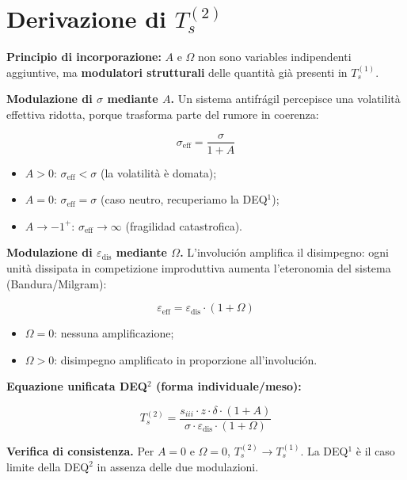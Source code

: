 \section{\texorpdfstring{Derivazione di
\(T_s^{(2)}\)}{Derivazione di T\_s\^{}\{(2)\}}}\label{se derivazione-di-t_s2}

\Hypoth{} \textbf{Principio di incorporazione:} \(A\) e \(\Omega\) non
sono variables indipendenti aggiuntive, ma \textbf{modulatori
strutturali} delle quantità già presenti in \(T_s^{(1)}\).

\textbf{Modulazione di \(\sigma\) mediante \(A\).} Un sistema antifrágil
percepisce una volatilità effettiva ridotta, porque trasforma parte del
rumore in coerenza:

\[
\sigma_{\text{eff}} = \frac{\sigma}{1 + A}
\]

\begin{itemize}
\tightlist
\item
  \(A > 0\): \(\sigma_{\text{eff}} < \sigma\) (la volatilità è domata);
\item
  \(A = 0\): \(\sigma_{\text{eff}} = \sigma\) (caso neutro, recuperiamo
  la DEQ$^1$);
\item
  \(A \to -1^+\): \(\sigma_{\text{eff}} \to \infty\) (fragilidad
  catastrofica).
\end{itemize}

\textbf{Modulazione di \(\varepsilon_{\text{dis}}\) mediante \(\Omega\).}
L'involución amplifica il disimpegno: ogni unità dissipata in
competizione improduttiva aumenta l'eteronomia del sistema
(Bandura/Milgram):

\[
\varepsilon_{\text{eff}} = \varepsilon_{\text{dis}} \cdot (1 + \Omega)
\]

\begin{itemize}
\tightlist
\item
  \(\Omega = 0\): nessuna amplificazione;
\item
  \(\Omega > 0\): disimpegno amplificato in proporzione all'involución.
\end{itemize}

\textbf{Equazione unificata DEQ$^2$ (forma individuale/meso):}

\[
\boxed{T_s^{(2)} = \frac{s_{iii} \cdot z \cdot \delta \cdot (1+A)}{\sigma \cdot \varepsilon_{\text{dis}} \cdot (1+\Omega)}}
\]

\Proved{} \textbf{Verifica di consistenza.} Per \(A = 0\) e
\(\Omega = 0\), \(T_s^{(2)} \to T_s^{(1)}\). La DEQ$^1$ è il caso limite
della DEQ$^2$ in assenza delle due modulazioni.



